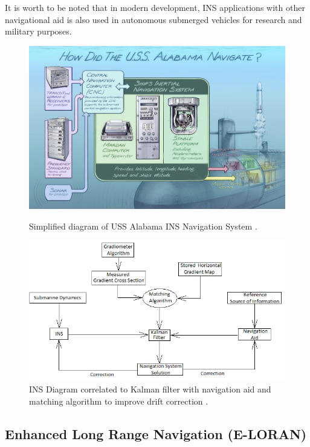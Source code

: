 \noindent It is worth to be noted that in modern development, INS applications with other navigational aid is also used in autonomous submerged vehicles for research and military purposes.

\begin{figure}[!ht]
    \centering
    \includegraphics[scale=0.5]{Figures/USS_Alabama_INS.jpg}
    \caption{Simplified diagram of USS Alabama INS Navigation System \cite{HowNavigation}. }
    \label{fig:USS_INS}
    \vspace{2mm}
    \includegraphics[scale=0.7]{Figures/INS Scheme KALMAN filter.png}
    \caption{INS Diagram correlated to Kalman filter with navigation aid and matching algorithm to improve drift correction \cite{Rogobete2018UsingPositioning}. }
    \label{fig:INS_KALMAN}
\end{figure}

\vspace{3cm}


\subsection{Enhanced Long Range Navigation (E-LORAN)}

